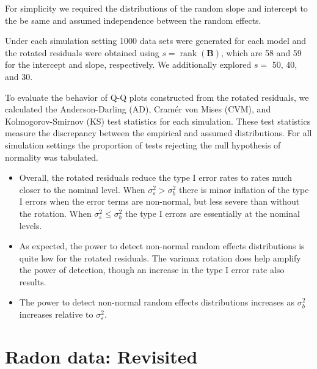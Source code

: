\documentclass[12pt]{article} %
\DeclareMathOperator{\rank}{rank}
\begin{document}
%
For simplicity we required the distributions of the random slope and intercept to the be same and assumed independence between the random effects. 

Under each simulation setting 1000 data sets were generated for each model and the rotated residuals were obtained using $s = \rank(\bm{B})$, which are 58 and 59 for the intercept and slope, respectively. We additionally explored $s =$ 50, 40, and 30.

To evaluate the behavior of Q-Q plots constructed from the rotated residuals, we calculated the Anderson-Darling (AD), Cram{\'e}r von Mises (CVM), and Kolmogorov-Smirnov (KS) test statistics for each simulation. These test statistics measure the discrepancy between the empirical and assumed distributions. For all simulation settings the proportion of tests rejecting the null hypothesis of normality was tabulated. 



\begin{itemize}
\item Overall, the rotated residuals reduce the type I error rates to rates much closer to the nominal level. When $\sigma^2_\varepsilon > \sigma^2_b$ there is minor inflation of the type I errors when the error terms are non-normal, but less severe than without the rotation. When $\sigma^2_\varepsilon \leq \sigma^2_b$ the type I errors are essentially at the nominal levels.

\item As expected, the power to detect non-normal random effects distributions is quite low for the rotated residuals. The varimax rotation does help amplify the power of detection, though an increase in the type I error rate also results.

\item The power to detect non-normal random effects distributions increases as $\sigma^2_b$ increases relative to $\sigma^2_\varepsilon$.


\end{itemize}

\section{Radon data: Revisited}\label{sec:radon2}
\end{document}
